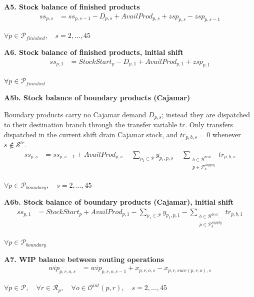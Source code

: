 \documentclass{article}
\begin{document}
\noindent\textbf{A5. Stock balance of finished products}
\begin{align}
ss_{p,s}
&=
ss_{p,s-1}
- D_{p,s}
+ AvailProd_{p,s}
+ zsp_{p,s}
- zsp_{p,s-1}
\label{eq:A5_finished_balance}
\end{align}
\begin{center}
$\forall p \in \mathcal{P}_{finished}, \quad s = 2,\dots,45$
\end{center}

\noindent\textbf{A6. Stock balance of finished products, initial shift}
\begin{align}
ss_{p,1}
&=
StockStart_p
- D_{p,1}
+ AvailProd_{p,1}
+ zsp_{p,1}
\label{eq:A6_finished_initial}
\end{align}
\begin{center}
$\forall p \in \mathcal{P}_{finished}$
\end{center}


\noindent\textbf{A5b. Stock balance of boundary products (Cajamar)}

Boundary products carry no Cajamar demand $D_{p,s}$; instead they are dispatched to their destination branch through the transfer variable $tr$. Only transfers dispatched in the current shift drain Cajamar stock, and $tr_{p,b,s}=0$ whenever $s \notin \mathcal{S}^{tr}$.
\begin{align}
ss_{p,s}
&=
ss_{p,s-1}
+ AvailProd_{p,s}
- \sum_{p_1 \in \mathcal{P}} y_{p_1,p,s}
- \sum_{\substack{b \in \mathcal{B}^{dest}:\\ p \in \mathcal{P}^{supply}_b}} tr_{p,b,s}
\label{eq:A9b_boundary_balance}
\end{align}
\begin{center}
$\forall p \in \mathcal{P}_{boundary}, \quad s = 2,\dots,45$
\end{center}

\noindent\textbf{A6b. Stock balance of boundary products (Cajamar), initial shift}
\begin{align}
ss_{p,1}
&=
StockStart_p
+ AvailProd_{p,1}
- \sum_{p_1 \in \mathcal{P}} y_{p_1,p,1}
- \sum_{\substack{b \in \mathcal{B}^{dest}:\\ p \in \mathcal{P}^{supply}_b}} tr_{p,b,1}
\label{eq:A10b_boundary_initial}
\end{align}
\begin{center}
$\forall p \in \mathcal{P}_{boundary}$
\end{center}



\noindent\textbf{A7. WIP balance between routing operations}
\begin{align}
wip_{p,r,o,s}
&=
wip_{p,r,o,s-1}
+ x_{p,r,o,s}
- x_{p,r,succ(p,r,o),s}
\label{eq:A7_wip_balance}
\end{align}
\begin{center}
$\forall p \in \mathcal{P}, \quad
\forall r \in \mathcal{R}_p, \quad
\forall o \in \mathcal{O}^{int}(p,r), \quad
s = 2,\dots,45$
\end{center}
\end{document}
